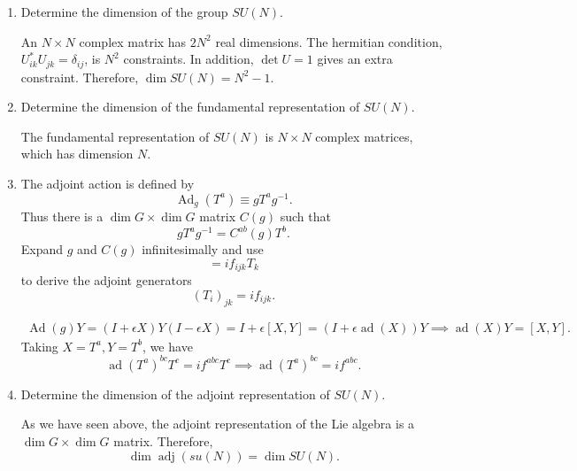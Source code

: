 \begin{enumerate}[label=\alph*)]
    \item Determine the dimension of the group $SU(N)$.
    \begin{solution}
        An $N\times N$ complex matrix has $2N^2$ real dimensions. The hermitian condition, $U^*_{ik}U_{jk} = \delta_{ij}$, is $N^2$ constraints. In addition, $\det U =1$ gives an extra constraint. Therefore, $\dim SU(N) = N^2 -1$.
    \end{solution}

    \item Determine the dimension of the fundamental representation of $SU(N)$.
    \begin{solution}
        The fundamental representation of $SU(N)$ is $N \times N$ complex matrices, which has dimension $N$.
    \end{solution}

    \item The adjoint action is defined by
    \begin{equation}
        \operatorname{Ad}_g(T^a)\equiv gT^ag^{-1}.
    \end{equation}
    Thus there is a $\dim G\times\dim G$ matrix $C(g)$ such that
    \begin{equation}
        gT^ag^{-1}=C^{ab}(g)T^b.
    \end{equation}
    Expand $g$ and $C(g)$ infinitesimally and use
    \begin{equation}
        [T_i,T_j]=if_{ijk}T_k
    \end{equation}
    to derive the adjoint generators
    \begin{equation}
        (T_i)_{jk}=if_{ijk}.
    \end{equation}
    \begin{solution}
        \begin{equation}
            \begin{aligned}
                \operatorname{Ad}(g)Y = (I + \epsilon X)Y(I-\epsilon X) = I + \epsilon[X,Y] = (I + \epsilon \operatorname{ad}(X))Y \implies \operatorname{ad}(X)Y = [X,Y].
            \end{aligned}
        \end{equation}
        Taking $X = T^a, Y=T^b$, we have
        \begin{equation}
            \operatorname{ad}(T^a)^{bc}T^c = if^{abc}T^c \implies \operatorname{ad}(T^a)^{bc} =if^{abc}.
        \end{equation}
    \end{solution}

    \item Determine the dimension of the adjoint representation of $SU(N)$.
    \begin{solution}
        As we have seen above, the adjoint representation of the Lie algebra is a $\dim G \times \dim G$ matrix. Therefore,
        \begin{equation}
            \dim \operatorname{adj}(su(N)) = \dim SU(N).
        \end{equation}
    \end{solution}
\end{enumerate}

